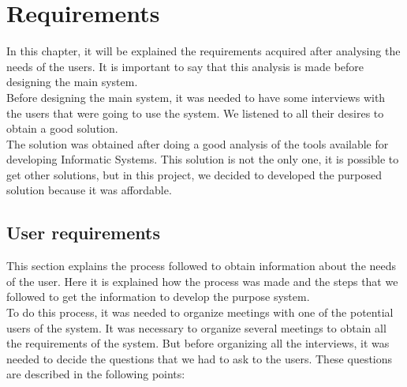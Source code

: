 
\chapter{Requirements}
\newpage

In this chapter, it will be explained the requirements acquired after analysing the needs of the users. It is important to say that this analysis is made before designing the main system.\\

Before designing the main system, it was needed to have some interviews with the users that were going to use the system. We listened to all their desires to obtain a good solution.\\

The solution was obtained after doing a good analysis of the tools available for developing Informatic Systems. This solution is not the only one, it is possible to get other solutions, but in this project, we decided to developed the purposed solution because it was affordable.

\section{User requirements}

This section explains the process followed to obtain information about the needs of the user. Here it is explained how the process was made and the steps that we followed to get the information to develop the purpose system.\\

To do this process, it was needed to organize meetings with one of the potential users of the system. It was necessary to organize several meetings to obtain all the requirements of the system. But before organizing all the interviews, it was needed to decide the questions that we had to ask to the users. These questions are described in the following points:


